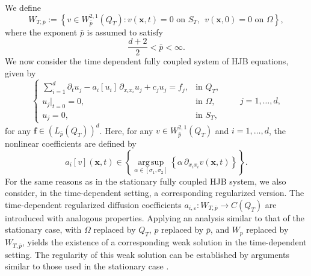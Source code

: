 \documentclass[final,onefignum,onetabnum]{mousaviart}
\begin{document}
	We define
	\begin{equation}
		\label{eq:space-time-dependent}
		W_{T , \bar{p}}:= 
		\left\lbrace 
		v \in W^{2,1}_{\bar{p}}(Q_T): v(\boldsymbol{x}, t)= 0 \text{ on } S_T , ~~ v(\boldsymbol{x}, 0) = 0 \text{ on } \Omega 
		\right\rbrace ,
	\end{equation}
	where the exponent $\bar{p}$ is assumed to satisfy 
	\[
	\dfrac{d+2}{2} < {\bar{p}} < \infty.
	\]
	We now consider the time dependent fully coupled system of HJB equations, given by
	\begin{equation}
		\label{coupled-HJB-main-parabolic}
		\begin{cases}
			\displaystyle
			\sum_{i=1}^{d}
			\partial_t u_j - 
			a_i[u_i]\, \partial_{x_i x_i} u_j + c_j u_j = f_j,
			& \text{in } Q_T, \\[0.5em]
			u_j |_{t=0} = 0,
			& \text{in } \Omega, \\[0.5em]
			u_j =0, 
			& \text{in } S_T,
		\end{cases}
		\qquad j=1,\dots,d ,
	\end{equation}
	for any $\boldsymbol{f} \in (L_{\bar{p}}(Q_T))^{d}$. Here, for any $v\in W^{2,1}_{\bar{p}}(Q_T)$ and $i=1,\dots,d$, the nonlinear coefficients are defined by
	\[
	a_i[v](\boldsymbol{x}, t)
	\in
	\left\lbrace 
	\operatorname*{arg\,sup}_{\alpha \in [\sigma_1,\sigma_2]}
	\left\{ \alpha \, \partial_{x_i x_i} v (\boldsymbol{x}, t) \right\}
	\right\rbrace .
	\]
	For the same reasons as in the stationary fully coupled HJB system, we also consider, in the time-dependent setting, a corresponding regularized version. The time-dependent regularized diffusion coefficients $a_{i, \varepsilon}: W_{T, \bar{p}} \rightarrow C(Q_T)$ are introduced with analogous properties.
	Applying an analysis similar to that of the stationary case, with  $\Omega$ replaced by $Q_T$, $p$ replaced by $\bar{p}$, and $W_p$ replaced by $W_{T, \bar{p}}$, yields the existence of a corresponding weak solution in the time-dependent setting. The regularity of this weak solution can be established by arguments similar to those used in the stationary case \cite{kuo2008maximum}.
		
	\appendix
\end{document}
